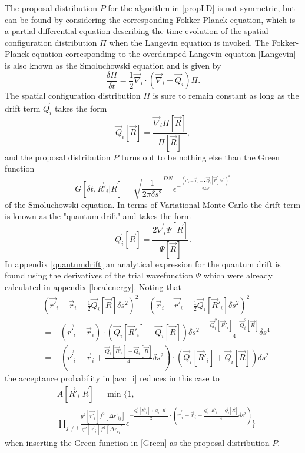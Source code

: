 \documentclass[a4paper,8pt]{article}
\begin{document}
\begin{multicols}{2}
The proposal distribution $P$ for the algorithm in \eqref{propLD} is not symmetric, but can be found by considering the corresponding Fokker-Planck equation, which is a partial differential equation describing the time evolution of the spatial configuration distribution $\Pi$ when the Langevin equation is invoked. The Fokker-Planck equation corresponding to the overdamped Langevin equation \eqref{Langevin} is also known as the Smoluchowski equation and is given by
\begin{equation}
\frac{\delta\Pi}{\delta t} = \frac{1}{2}\vec{\nabla}_i\cdot\left(\vec{\nabla}_i-\vec{Q}_i\right)\Pi. \label{Smoluchowski}
\end{equation}
The spatial configuration distribution $\Pi$ is sure to remain constant as long as the drift term $\vec{Q}_i$ takes the form
\begin{equation}
\vec{Q}_i[\vec{R}] = \frac{\vec{\nabla}_i\Pi[\vec{R}]}{\Pi[\vec{R}]},
\end{equation}
and the proposal distribution $P$ turns out to be nothing else than the Green function
\begin{equation}
G[\delta t, \vec{R}'_i|\vec{R}] = \sqrt{\frac{1}{2\pi \delta s^2}}^{DN} \epsilon^{-\frac{\left(\vec{r'}_i-\vec{r}_i-\frac{1}{2}\vec{Q}_i[\vec{R}]\delta s^2\right)^2}{2\delta s^2}} \label{Green}
\end{equation}
of the Smoluchowski equation. In terms of Variational Monte Carlo the drift term is known as the "quantum drift" and takes the form
\begin{equation}
\vec{Q}_i[\vec{R}] = \frac{2\vec{\nabla}_i\Psi[\vec{R}]}{\Psi[\vec{R}]}. \label{defQuantumdrift}
\end{equation}
In appendix \ref{quantumdrift} an analytical expression for the quantum drift is found using the derivatives of the trial wavefunction $\Psi$ which were already calculated in appendix \ref{localenergy}. Noting that
\begin{align}
&\left(\vec{r'}_i-\vec{r}_i-\frac{1}{2}\vec{Q}_i[\vec{R}]\delta s^2 \right)^2-\left(\vec{r}_i-\vec{r'}_i-\frac{1}{2}\vec{Q}_i[\vec{R}'_i]\delta s^2\right)^2 \nonumber\\
&= -\left(\vec{r'}_i-\vec{r}_i\right) \cdot \left(\vec{Q}_i[\vec{R}'_i]+\vec{Q}_i[\vec{R}]\right)\delta s^2-\frac{\vec{Q}_i^2[\vec{R}'_i]-\vec{Q}_i^2[\vec{R}]}{4}\delta s^4 \nonumber\\
&= -\left(\vec{r'}_i-\vec{r}_i+\frac{\vec{Q}_i[\vec{R}'_i]-\vec{Q}_i[\vec{R}]}{4}\delta s^2\right)\cdot\left(\vec{Q}_i[\vec{R}'_i]+\vec{Q}_i[\vec{R}]\right)\delta s^2 \nonumber
\end{align}
the acceptance probability in \eqref{acc_i} reduces in this case to
\begin{align}
&A[\vec{R}'_i|\vec{R}] = \min\Bigg\{1, \nonumber\\
&\prod\limits_{j \neq i} \frac{g^2[\vec{r'}_i]f^2[\Delta r'_{ij}]}{g^2[\vec{r}_i]f^2[\Delta r_{ij}]}\epsilon^{-\frac{\vec{Q}_i[\vec{R}'_i]+\vec{Q}_i[\vec{R}]}{2}\cdot\left(\vec{r'}_i-\vec{r}_i+\frac{\vec{Q}_i[\vec{R}'_i]-\vec{Q}_i[\vec{R}]}{4}\delta s^2\right)}\Bigg\} \label{accLD}
\end{align}
when inserting the Green function in \eqref{Green} as the proposal distribution $P$.


\end{multicols}
\end{document}

